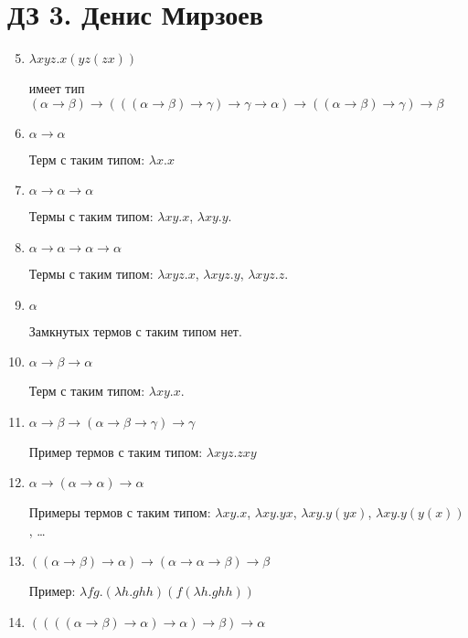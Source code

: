 \documentclass[12pt, landscape, a3paper] {article}
\begin{document}
\frenchspacing
\pagestyle{empty}
\section{ДЗ 3. Денис Мирзоев}

\begin{enumerate} \setcounter{enumi}{4}

    \item $\lambda x y z . x (y z (z x))$

        имеет тип $ (\alpha \to \beta) \to (((\alpha \to \beta) \to \gamma) \to \gamma \to \alpha) \to ((\alpha \to \beta) \to \gamma) \to \beta$

    \item $\alpha \to \alpha$ 

        Терм с таким типом: $\lambda x.x$

    \item $\alpha \to \alpha \to \alpha$

        Термы с таким типом: $\lambda xy.x$, $\lambda xy.y$.

    \item $\alpha \to \alpha \to \alpha \to \alpha$

        Термы с таким типом: $\lambda xyz.x$, $\lambda xyz.y$, $\lambda xyz.z$.

    \item $\alpha$

        Замкнутых термов с таким типом нет.

    \item $\alpha \to \beta \to \alpha$

        Терм с таким типом: $\lambda xy.x$.

    \item $\alpha \to \beta \to (\alpha \to \beta \to \gamma) \to \gamma$

        Пример термов с таким типом: $\lambda xyz.zxy$

    \item $\alpha \to (\alpha \to \alpha) \to \alpha$

        Примеры термов с таким типом: $\lambda xy.x$, $\lambda xy.yx$, $\lambda xy.y(yx)$, $\lambda xy.y(y(x))$, \ldots

    \item $((\alpha \to \beta) \to \alpha) \to (\alpha \to \alpha \to \beta) \to \beta$

        Пример: $\lambda fg.(\lambda h.ghh)(f(\lambda h.ghh))$

    \item $((((\alpha \to \beta) \to \alpha) \to \alpha) \to \beta) \to \alpha$


\end{enumerate}
\end{document}
